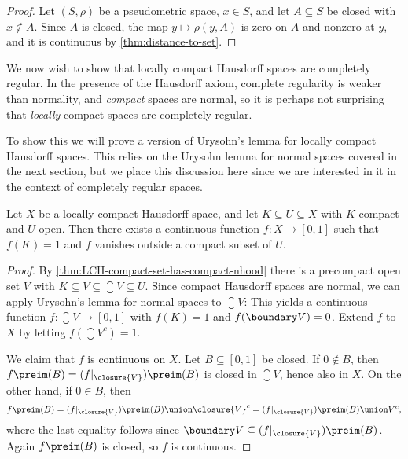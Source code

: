 \documentclass[article, a4paper, 11pt, oneside]{memoir}
\numberwithin{equation}{chapter}
\begin{document}
\begin{proof}
    Let $(S,\rho)$ be a pseudometric space, $x \in S$, and let $A \subseteq S$ be closed with $x \not\in A$. Since $A$ is closed, the map $y \mapsto \rho(y,A)$ is zero on $A$ and nonzero at $y$, and it is continuous by \cref{thm:distance-to-set}.
\end{proof}


We now wish to show that locally compact Hausdorff spaces are completely regular. In the presence of the Hausdorff axiom, complete regularity is weaker than normality, and \emph{compact} spaces are normal, so it is perhaps not surprising that \emph{locally} compact spaces are completely regular.

To show this we will prove a version of Urysohn's lemma for locally compact Hausdorff spaces. This relies on the Urysohn lemma for normal spaces covered in the next section, but we place this discussion here since we are interested in it in the context of completely regular spaces.


\begin{theorem}
    \label{thm:Urysohn-LCH}
    Let $X$ be a locally compact Hausdorff space, and let $K \subseteq U \subseteq X$ with $K$ compact and $U$ open. Then there exists a continuous function $f \colon X \to [0,1]$ such that $f(K) = 1$ and $f$ vanishes outside a compact subset of $U$.
\end{theorem}

\begin{proof}
    By \cref{thm:LCH-compact-set-has-compact-nhood} there is a precompact open set $V$ with $K \subseteq V \subseteq \closure{V} \subseteq U$. Since compact Hausdorff spaces are normal, we can apply Urysohn's lemma for normal spaces to $\closure{V}$: This yields a continuous function $f \colon \closure{V} \to [0,1]$ with $f(K) = 1$ and $f(\boundary V) = 0$. Extend $f$ to $X$ by letting $f(\closure{V}^c) = 1$.

    We claim that $f$ is continuous on $X$. Let $B \subseteq [0,1]$ be closed. If $0 \not\in B$, then $f\preim(B) = (f|_{\closure{V}})\preim(B)$ is closed in $\closure{V}$, hence also in $X$. On the other hand, if $0 \in B$, then
    \begin{equation*}
        f\preim(B)
            = (f|_{\closure{V}})\preim(B) \union \closure{V}^c
            = (f|_{\closure{V}})\preim(B) \union V^c,
    \end{equation*}
    where the last equality follows since $\boundary V \subseteq (f|_{\closure{V}})\preim(B)$. Again $f\preim(B)$ is closed, so $f$ is continuous.
\end{proof}
\end{document}
